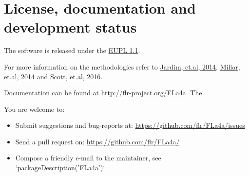 \section{License, documentation and development status}

The software is released under the \href{https://joinup.ec.europa.eu/community/eupl/home}{EUPL 1.1}.

For more information on the \aFa methodologies refer to \href{http://icesjms.oxfordjournals.org/content/early/2014/04/03/icesjms.fsu050.abstract}{Jardim, et.al, 2014}, \href{http://icesjms.oxfordjournals.org/content/early/2014/03/31/icesjms.fsu043.abstract}{Millar, et.al, 2014} and \href{http://journals.plos.org/plosone/article?id=10.1371/journal.pone.0154922}{Scott, et.al, 2016}.

Documentation can be found at \url{http://flr-project.org/FLa4a}. The 

You are welcome to:

\begin{itemize}
	\item Submit suggestions and bug-reports at: \url{https://github.com/flr/FLa4a/issues}
	\item Send a pull request on: \url{https://github.com/flr/FLa4a/}
	\item Compose a friendly e-mail to the maintainer, see `packageDescription('FLa4a')`
\end{itemize}


